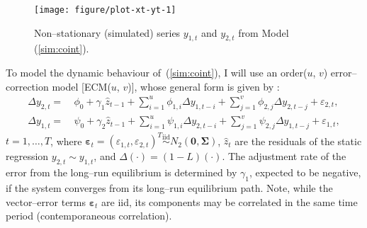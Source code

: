 \documentclass[a4paper, 11pt]{article}\usepackage[]{graphicx}\usepackage[]{color}
\newenvironment{knitrout}{}{} %
\begin{document}
\begin{figure}[t!]
\begin{center}
\vspace{-10mm}
\begin{knitrout}\scriptsize
{}\color{fgcolor}

{\centering \texttt{[image: figure/plot-xt-yt-1]} 

}



\end{knitrout}
\end{center}
\caption{Non--stationary (simulated) series 
{\color{darkblue} $y_{1, t}$} and
{\color{darkblue} $y_{2, t}$} from
Model (\ref{sim:coint}).}
\label{xt:yt}
\end{figure}


\vspace{3mm}
To model the dynamic behaviour of~(\ref{sim:coint}), I will 
use an order($u$, $v$) error--correction model  [ECM($u$, $v$)],
whose general form is given by 
\citep[equations 4.5a and 4.5b, Ch. 4 in][]{pfaf:2011}:
%
\begin{align} \label{ecm:model}
\Delta y_{2, t} =~&\phi_0 + \gamma_1 \widehat{z}_{t - 1} +
 \sum_{i = 1}^u \phi_{1, i} \Delta y_{1, t - i} +
 \sum_{j = 1}^v \phi_{2, j} \Delta y_{2, t - j} +
 \varepsilon_{2, t}, \\
 \nonumber \Delta y_{1, t} =~&\psi_0 + \gamma_2 \widehat{z}_{t - 1} +
 \sum_{i = 1}^u \psi_{1, i} \Delta y_{2, t - i} +
 \sum_{j = 1}^v \psi_{2, j} \Delta y_{1, t - j} +
 \varepsilon_{1, t},
\end{align}
\noindent
$t = 1, \ldots, T$,
 where $\mathbold{\varepsilon}_t = 
(\varepsilon_{1, t}, \varepsilon_{2, t})^T
\stackrel{\textrm{iid}}{\sim} N_2(\mathbf{0}, 
\mathbf{\Sigma})$,
$\widehat{z}_t$ are the residuals of the static regression
$y_{2, t} \sim y_{1, t}$,
and $\Delta (\cdot) = (1 - L)(\cdot)$. The adjustment rate of the 
error from the long--run equilibrium is determined by $\gamma_1$,
expected to be negative, if the system converges from its long--run
equilibrium path.
Note, while the vector--error terms
$\mathbold{\varepsilon}_t$ are iid, 
its components may be correlated  in the same time period
(contemporaneous correlation).

  
  
\end{document}
